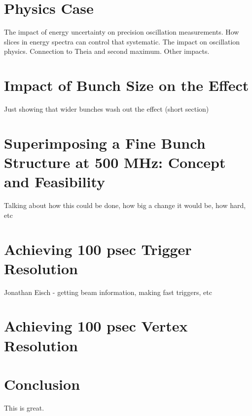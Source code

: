 \documentclass[preprint,12pt]{elsarticle}
\begin{document}
\section{Physics Case}

The impact of energy uncertainty on precision oscillation measurements. How slices in energy spectra can control that systematic. The impact on oscillation physics. Connection to Theia and second maximum. Other impacts.


\section{Impact of Bunch Size on the Effect}

Just showing that wider bunches wash out the effect (short section)


\section{Superimposing a Fine Bunch Structure at 500 MHz: Concept and Feasibility}

Talking about how this could be done, how big a change it would be, how hard, etc

\section{Achieving 100 psec Trigger Resolution}

Jonathan Eisch - getting beam information, making fast triggers, etc

\section{Achieving 100 psec Vertex Resolution}


\section{Conclusion}

This is great.



\end{document}
